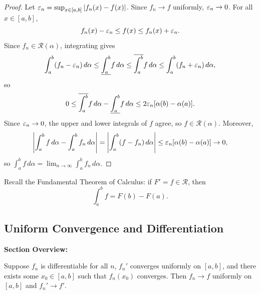 \documentclass[../master/master.tex]{subfiles}
\begin{document}
\begin{proof}
Let $\varepsilon_n = \sup_{x \in [a,b]} |f_n(x) - f(x)|$. Since $f_n \to f$ uniformly, $\varepsilon_n \to 0$. For all $x \in [a,b]$,
\[
f_n(x) - \varepsilon_n \leq f(x) \leq f_n(x) + \varepsilon_n.
\]
Since $f_n \in \mathscr{R}(\alpha)$, integrating gives
\[
\int_a^b (f_n - \varepsilon_n)\,d\alpha \leq \underline{\int_a^b} f\,d\alpha \leq \overline{\int_a^b} f\,d\alpha \leq \int_a^b (f_n + \varepsilon_n)\,d\alpha,
\]
so
\[
0 \leq \overline{\int_a^b} f\,d\alpha - \underline{\int_a^b} f\,d\alpha \leq 2\varepsilon_n [\alpha(b) - \alpha(a)].
\]
Since $\varepsilon_n \to 0$, the upper and lower integrals of $f$ agree, so $f \in \mathscr{R}(\alpha)$. Moreover,
\[
\left| \int_a^b f\,d\alpha - \int_a^b f_n\,d\alpha \right| = \left| \int_a^b (f - f_n)\,d\alpha \right| \leq \varepsilon_n [\alpha(b) - \alpha(a)] \to 0,
\]
so $\int_a^b f\,d\alpha = \lim_{n \to \infty} \int_a^b f_n\,d\alpha$.
\end{proof}

Recall the Fundamental Theorem of Calculus: if $F' = f \in \mathscr{R}$, then
\[
\int_a^b f = F(b) - F(a).
\]

\subsection{Uniform Convergence and Differentiation}

\begin{summarybox}
\textbf{Section Overview:}
\end{summarybox}

\begin{theorem}
Suppose $f_n$ is differentiable for all $n$, $f_n'$ converges uniformly on $[a,b]$, and there exists some $x_0 \in [a,b]$ such that $f_n(x_0)$ converges. Then $f_n \to f$ uniformly on $[a,b]$ and $f_n' \to f'$.
\end{theorem}
\end{document}
